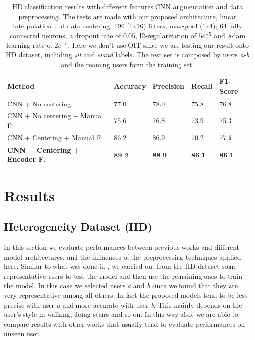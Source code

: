 
\begin{table}[t]
	\centering
		\begin{tabular}{ p{7cm}p{2cm}p{2cm}p{2cm}p{2cm} }
			\hline
			Method & Accuracy & Precision & Recall & F1-Score \\
			\hline
			CNN + No centering & 77.0 & 78.0 & 75.8 & 76.8 \\
			CNN + No centering + Manual F. & 75.6 & 76.8 & 73.9 & 75.3 \\
			CNN + Centering + Manual F. & 86.2 & 86.9 & 70.2 & 77.6 \\
			\textbf{CNN + Centering + Encoder F.} & \textbf{89.2} & \textbf{88.9} &  \textbf{86.1} & \textbf{86.1} \\
			\hline
		\end{tabular}
		\caption{\label{tab:model-performance} HD
                  classification results with different features CNN
                  augmentation and data preprocessing. The tests are
                  made with our proposed architecture, linear
                  interpolation and data centering, 196 (1x16)
                  filters, max-pool (1x4), 64 fully connected neurons,
                  a dropout rate of $0.05$, l2-regularization of
                  $5e^{-5}$ and Adam learning rate of $2e^{-5}$. Here
                  we don't use OIT since we are testing our result
                  onto HD dataset, including \textit{sit} and
                  \textit{stand} labels. The test set is composed by
                  users \textit{a-b} and the reaming users form the
                  training set.}
\end{table}

\section{Results}
\label{sec:results}

\subsection{Heterogeneity Dataset (HD)}
\label{subsec:heterogeneity-dataset}

In this section we evaluate performances between previous works and
different model architectures, and the influences of the preprocessing
techniques applied here. Similar to what was done in
\cite{ignatov2018real}, we carried out from the HD dataset some
representative users to test the model and then use the remaining ones
to train the model. In this case we selected users \textit{a} and
\textit{b} since we found that they are very representative among all
others. In fact the proposed models tend to be less precise with user
\textit{a} and more accurate with user \textit{b}. This mainly depends
on the user's style in walking, doing stairs and so on. In this way also, we
are able to compare results with other works that usually tend to
evaluate performances on unseen user.

